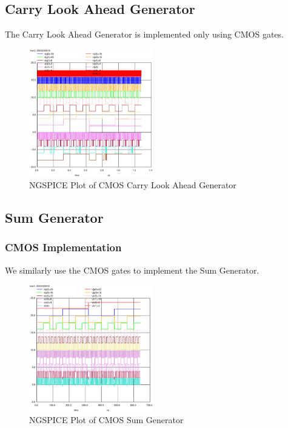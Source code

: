 \documentclass[conference]{IEEEtran}
\begin{document}
\subsection{Carry Look Ahead Generator}

The Carry Look Ahead Generator is implemented only using CMOS gates.

\begin{figure}[H]
    \centering
    \includegraphics[width=0.48\textwidth]{images/cla_gen_cmos_tran.eps}
    \caption{NGSPICE Plot of CMOS Carry Look Ahead Generator}
\end{figure}

\subsection{Sum Generator}

\subsubsection{CMOS Implementation}

We similarly use the CMOS gates to implement the Sum Generator.

\begin{figure}[H]
    \centering
    \includegraphics[width=0.48\textwidth]{images/sum_gen_cmos_tran.eps}
    \caption{NGSPICE Plot of CMOS Sum Generator}
\end{figure}
\end{document}
